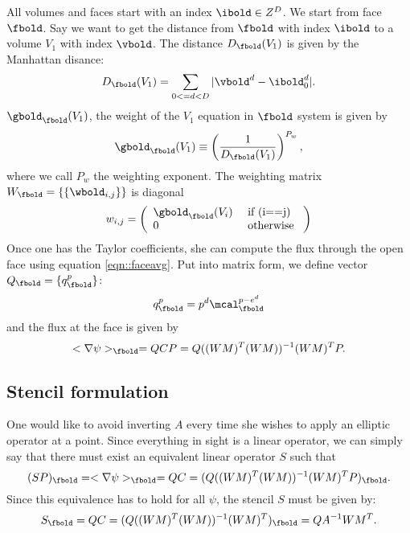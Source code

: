 \documentclass{article}
\begin{document}
{All volumes and faces  start with an  index $\ibold \in Z^D$.
We start from face $\fbold$.   Say we want to get
the distance from $\fbold$ with index $\ibold$ to a volume $V_1$
with index $\vbold$.  The distance $D_\fbold(V_1)$ is given by
the Manhattan disance:
\begin{equation}
  D_\fbold(V_1) = \sum\limits_{0 <= d < D} |\vbold^d - \ibold_0^d|.
\label{eqn::uptownFunk}
\end{equation}
$\gbold_\fbold(V_1)$, the weight of the $V_1$ equation in $\fbold$ system
is given by
\begin{equation}
  \gbold_\fbold(V_1)  \equiv \left(\frac{1}{D_\fbold(V_1) } \right)^{P_w},
\label{eqn::weightFunk}  
\end{equation}
where we call $P_w$ the weighting exponent.
The weighting matrix $W_\fbold = \{\{\wbold_{i,j}\}\}$ is diagonal
\begin{equation}
w_{i,j} =
\left(
\begin{array}{ll}
 \gbold_\fbold(V_i) & \mbox{ if } $(i==j)$ \\
 0   & \mbox{ otherwise }
\end{array}
\right)
\end{equation}
Once one has the Taylor coefficients, she can compute the flux through
the open face using  equation \ref{eqn::faceavg}.   Put into matrix
form, we define  vector  $Q_\fbold = \{q^p_\fbold\}$:
\begin{equation}
q^p_\fbold = p^d \mcal^{p-e^d}_\fbold
\end{equation}
and the flux at the face is given by
\begin{equation}
<\nabla \psi>_\fbold = Q C P= Q ((WM)^T(WM))^{-1} (WM)^T  P.
\end{equation}

\subsection{Stencil formulation}
One would like to avoid inverting $A$ every time she wishes to apply
an elliptic operator at a point.  Since everything in sight is a
linear operator, we can simply say that there must exist an equivalent
linear operator $S$ such that
\begin{equation}
(S P)_\fbold = <\nabla \psi>_\fbold = Q C= (Q ((WM)^T(WM))^{-1} (WM)^T  P)_\fbold.
\end{equation}
Since this equivalence has to hold for all $\psi$, the stencil $S$ must be
given by:
\begin{equation}
 S_\fbold = Q C = (Q ((WM)^T(WM))^{-1} (WM)^T  )_\fbold = Q A^{-1} WM^T.
\end{equation}

}
\end{document}
